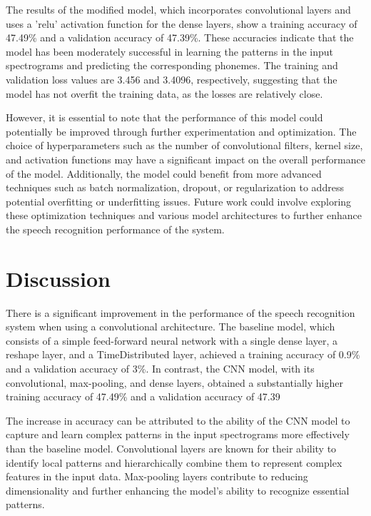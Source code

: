 \documentclass[12pt]{article}
\begin{document}
The results of the modified model, which incorporates convolutional layers and uses a 'relu' activation function for the dense layers, show a training accuracy of 47.49\% and a validation accuracy of 47.39\%. These accuracies indicate that the model has been moderately successful in learning the patterns in the input spectrograms and predicting the corresponding phonemes. The training and validation loss values are 3.456 and 3.4096, respectively, suggesting that the model has not overfit the training data, as the losses are relatively close.

However, it is essential to note that the performance of this model could potentially be improved through further experimentation and optimization. The choice of hyperparameters such as the number of convolutional filters, kernel size, and activation functions may have a significant impact on the overall performance of the model. Additionally, the model could benefit from more advanced techniques such as batch normalization, dropout, or regularization to address potential overfitting or underfitting issues. Future work could involve exploring these optimization techniques and various model architectures to further enhance the speech recognition performance of the system.


\section{Discussion}

There is a significant improvement in the performance of the speech recognition system when using a convolutional architecture. The baseline model, which consists of a simple feed-forward neural network with a single dense layer, a reshape layer, and a TimeDistributed layer, achieved a training accuracy of 0.9\% and a validation accuracy of 3\%. In contrast, the CNN model, with its convolutional, max-pooling, and dense layers, obtained a substantially higher training accuracy of 47.49\% and a validation accuracy of 47.39%

The increase in accuracy can be attributed to the ability of the CNN model to capture and learn complex patterns in the input spectrograms more effectively than the baseline model. Convolutional layers are known for their ability to identify local patterns and hierarchically combine them to represent complex features in the input data. Max-pooling layers contribute to reducing dimensionality and further enhancing the model's ability to recognize essential patterns.
\end{document}
